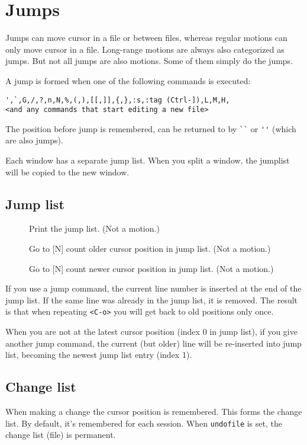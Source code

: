 \section{Jumps}
Jumps can move cursor in a file or between files, whereas regular motions can only move cursor in a file.
Long-range motions are always also categorized as jumps. But not all jumps are also motions. Some of them simply do the jumps.

A jump is formed when one of the following commands is executed:
\begin{lstlisting}[columns=flexible]
',`,G,/,?,n,N,%,(,),[[,]],{,},:s,:tag (Ctrl-]),L,M,H,
<and any commands that start editing a new file>
\end{lstlisting}
The position before jump is remembered, can be returned to by \verb|``| or \verb|''| (which are also jumps).

Each window has a separate jump list. When you split a window, the jumplist will be copied to the new window.
\subsection{Jump list}
\begin{description}
  \item[] Print the jump list. (Not a motion.)
  \item[] Go to [N] count older cursor position in jump list. (Not a motion.)
  \item[] Go to [N] count newer cursor position in jump list. (Not a motion.)
\end{description}

If you use a jump command, the current line number is inserted at the end of
the jump list.  If the same line was already in the jump list, it is removed.
The result is that when repeating \verb|<C-o>| you will get back to old positions
only once.

When you are not at the latest cursor position (index 0 in jump list), if you give another jump command, the current (but older) line will be re-inserted into jump list, becoming the newest jump list entry (index 1).
\subsection{Change list}
When making a change the cursor position is remembered. This forms the change list. By default, it's remembered for each session. When \verb|undofile| is set, the change list (file) is permanent.

